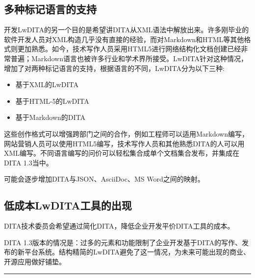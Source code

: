 \documentclass[letterpaper,10pt,english]{sphinxmanual}
\begin{document}
\subsection{多种标记语言的支持}
\label{\detokenize{chap2:id4}}
开发LwDITA的另一个目的是希望讲DITA从XML语法中解放出来。许多刚毕业的软件开发人员对XML构造几乎没有直接的经验，而对Markdown和HTML等其他格式则更加熟悉。如今，技术写作人员采用HTML5进行网络结构化文档创建已经非常普遍；Markdown语言也被许多行业和学术界所接受。LwDITA针对这种情况，增加了对两种标记语言的支持，根据语言的不同，LwDITA分为以下三种:
\begin{itemize}
\item {} 
 基于XML的LwDITA

\item {} 
 基于HTML-5的LwDITA

\item {} 
 基于Markdown的DITA

\end{itemize}

这些创作格式可以增强跨部门之间的合作，例如工程师可以适用Markdown编写，网站营销人员可以使用HTML5编写，技术写作人员和其他熟悉DITA的人可以用XML编写。不同语言编写的问价可以轻松集合成单个文档集合发布，并集成在DITA 1.3当中。

 可能会逐步增加DITA与JSON、AsciiDoc、MS Word之间的映射。


\subsection{低成本LwDITA工具的出现}
\label{\detokenize{chap2:lwdita}}
DITA技术委员会希望通过简化DITA，降低企业开发平价DITA工具的成本。

DITA 1.3版本的情况是：过多的元素和功能限制了企业开发基于DITA的写作、发布的新平台系统。结构精简的LwDITA避免了这一情况，为未来可能出现的商业、开源应用做好铺垫。


\bigskip\hrule\bigskip
\end{document}
